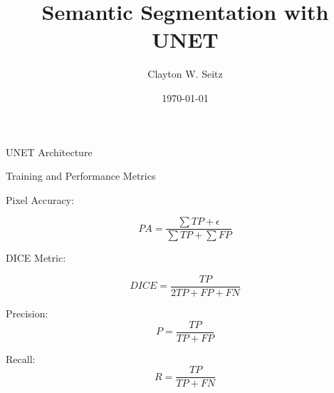 \documentclass[aspectratio=1610]{beamer}					%
\title{Semantic Segmentation with UNET}	%
\author{Clayton W. Seitz}								%
\date{\today}									%
\begin{document}
\begin{frame}
  \titlepage
\end{frame}

\begin{frame}{UNET Architecture}

\end{frame}

\begin{frame}{Training and Performance Metrics}

Pixel Accuracy: 

\begin{equation*}
PA = \frac{\sum TP+ \epsilon}{\sum TP +\sum FP}
\end{equation*}

DICE Metric: 

\begin{equation*}
DICE = \frac{TP}{2TP+FP+FN}
\end{equation*}

Precision:
\begin{equation*}
P = \frac{TP}{TP+FP}
\end{equation*}

Recall:
\begin{equation*}
R = \frac{TP}{TP+FN}
\end{equation*}

\end{frame}
\end{document}

